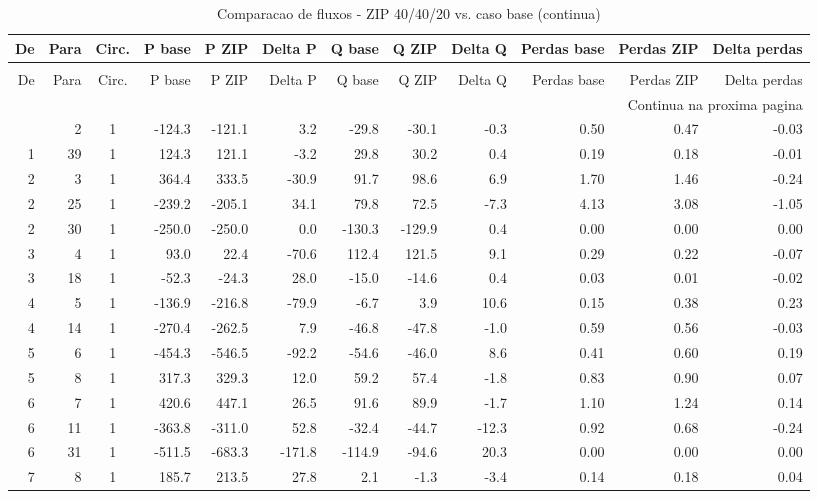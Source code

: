 \documentclass[12pt]{classe_uftex/uftex}
\begin{document}
\begin{landscape}
\tiny
\begin{longtable}{rrcrrrrrrrrr}
\caption{Comparacao de fluxos - ZIP 40/40/20 vs. caso base}\label{tab:fluxos-zip-base}\\
\toprule
De & Para & Circ. & P base & P ZIP & Delta P & Q base & Q ZIP & Delta Q & Perdas base & Perdas ZIP & Delta perdas \\
\midrule
\endfirsthead
\caption[]{Comparacao de fluxos - ZIP 40/40/20 vs. caso base (continua)}\\
\toprule
De & Para & Circ. & P base & P ZIP & Delta P & Q base & Q ZIP & Delta Q & Perdas base & Perdas ZIP & Delta perdas \\
\midrule
\endhead
\midrule
\multicolumn{12}{r}{Continua na proxima pagina}\\
\endfoot
\bottomrule
\endlastfoot
1 & 2 & 1 & -124.3 & -121.1 & 3.2 & -29.8 & -30.1 & -0.3 & 0.50 & 0.47 & -0.03 \\
1 & 39 & 1 & 124.3 & 121.1 & -3.2 & 29.8 & 30.2 & 0.4 & 0.19 & 0.18 & -0.01 \\
2 & 3 & 1 & 364.4 & 333.5 & -30.9 & 91.7 & 98.6 & 6.9 & 1.70 & 1.46 & -0.24 \\
2 & 25 & 1 & -239.2 & -205.1 & 34.1 & 79.8 & 72.5 & -7.3 & 4.13 & 3.08 & -1.05 \\
2 & 30 & 1 & -250.0 & -250.0 & 0.0 & -130.3 & -129.9 & 0.4 & 0.00 & 0.00 & 0.00 \\
3 & 4 & 1 & 93.0 & 22.4 & -70.6 & 112.4 & 121.5 & 9.1 & 0.29 & 0.22 & -0.07 \\
3 & 18 & 1 & -52.3 & -24.3 & 28.0 & -15.0 & -14.6 & 0.4 & 0.03 & 0.01 & -0.02 \\
4 & 5 & 1 & -136.9 & -216.8 & -79.9 & -6.7 & 3.9 & 10.6 & 0.15 & 0.38 & 0.23 \\
4 & 14 & 1 & -270.4 & -262.5 & 7.9 & -46.8 & -47.8 & -1.0 & 0.59 & 0.56 & -0.03 \\
5 & 6 & 1 & -454.3 & -546.5 & -92.2 & -54.6 & -46.0 & 8.6 & 0.41 & 0.60 & 0.19 \\
5 & 8 & 1 & 317.3 & 329.3 & 12.0 & 59.2 & 57.4 & -1.8 & 0.83 & 0.90 & 0.07 \\
6 & 7 & 1 & 420.6 & 447.1 & 26.5 & 91.6 & 89.9 & -1.7 & 1.10 & 1.24 & 0.14 \\
6 & 11 & 1 & -363.8 & -311.0 & 52.8 & -32.4 & -44.7 & -12.3 & 0.92 & 0.68 & -0.24 \\
6 & 31 & 1 & -511.5 & -683.3 & -171.8 & -114.9 & -94.6 & 20.3 & 0.00 & 0.00 & 0.00 \\
7 & 8 & 1 & 185.7 & 213.5 & 27.8 & 2.1 & -1.3 & -3.4 & 0.14 & 0.18 & 0.04 \\

\end{longtable}
\end{landscape}
\end{document}
